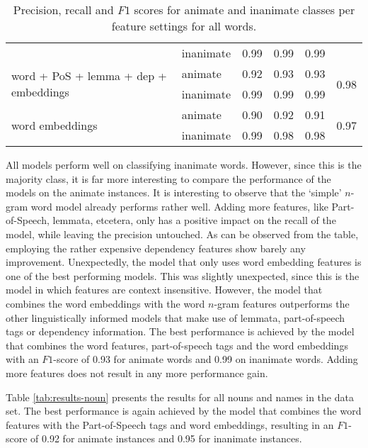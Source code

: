 \documentclass[a4paper,UKenglish]{oasics}
\begin{document}
\begin{table}
\begin{tabular}{llrrrr}
                                                         & inanimate & 0.99      & 0.99   & 0.99 &                       \\
\multirow{2}{*}{word + PoS + lemma + dep + embeddings}   & animate   & 0.92      & 0.93   & 0.93 & \multirow{2}{*}{0.98} \\
                                                         & inanimate & 0.99      & 0.99   & 0.99 &                       \\
\multirow{2}{*}{word embeddings}                         & animate   & 0.90      & 0.92   & 0.91 & \multirow{2}{*}{0.97} \\
                                                         & inanimate & 0.99      & 0.98   & 0.98 &                       \\

\bottomrule
\end{tabular}
\caption{Precision, recall and $F1$ scores for animate and inanimate classes per feature settings for all words.}
\label{tab:results-all}
\end{table}


All models perform well on classifying inanimate
words. However, since this is the majority class, it is far more
interesting to compare the performance of the models on the animate
instances. It is interesting to observe that the `simple' $n$-gram
word model already performs rather well. Adding more features, like
Part-of-Speech, lemmata, etcetera, only has a positive impact on the
recall of the model, while leaving the precision untouched. As can be
observed from the table, employing the rather expensive dependency features show
barely any improvement. Unexpectedly, the model that only uses word embedding
features is one of the best performing models. This was slightly
unexpected, since this is the model in which features are context
insensitive. However, the model that combines the word embeddings with
the word $n$-gram features outperforms the other linguistically
informed models that make use of lemmata, part-of-speech tags or
dependency information. The best performance is achieved by the model
that combines the word features, part-of-speech tags and the word
embeddings with an $F1$-score of 0.93 for animate words and 0.99 on
inanimate words. Adding more features does not result in any more
performance gain.

Table \ref{tab:results-noun} presents the results for all nouns and
names in the data set. The best performance is again achieved by the
model that combines the word features with the Part-of-Speech tags and
word embeddings, resulting in an $F1$-score of 0.92 for animate
instances and 0.95 for inanimate instances.
\end{document}
